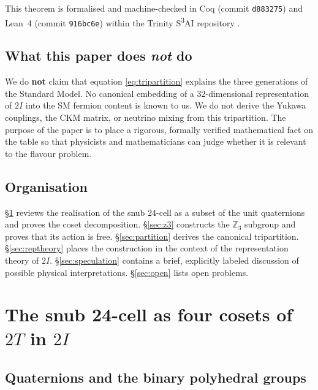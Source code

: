 \documentclass[10pt,reqno]{amsart}
\theoremstyle{plain}
\theoremstyle{definition}
\begin{document}
This theorem is formalised and machine-checked in Coq (commit \texttt{d883275}) and Lean~4 (commit \texttt{916bc6e}) within the Trinity S\textsuperscript{3}AI repository \cite{trinitys3ai}.

\subsection*{What this paper does \emph{not} do}

We do \textbf{not} claim that equation \eqref{eq:tripartition} explains the three generations of the Standard Model. No canonical embedding of a $32$-dimensional representation of $2I$ into the SM fermion content is known to us. We do not derive the Yukawa couplings, the CKM matrix, or neutrino mixing from this tripartition. The purpose of the paper is to place a rigorous, formally verified mathematical fact on the table so that physicists and mathematicians can judge whether it is relevant to the flavour problem.

\subsection*{Organisation}

\S\ref{sec:snub} reviews the realisation of the snub 24-cell as a subset of the unit quaternions and proves the coset decomposition. \S\ref{sec:z3} constructs the $\mathbb{Z}_3$ subgroup and proves that its action is free. \S\ref{sec:partition} derives the canonical tripartition. \S\ref{sec:reptheory} places the construction in the context of the representation theory of $2I$. \S\ref{sec:speculation} contains a brief, explicitly labeled discussion of possible physical interpretations. \S\ref{sec:open} lists open problems.

\section{The snub 24-cell as four cosets of $2T$ in $2I$}\label{sec:snub}

\subsection{Quaternions and the binary polyhedral groups}
\end{document}
